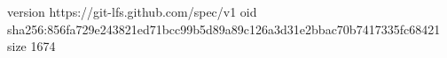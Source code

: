 version https://git-lfs.github.com/spec/v1
oid sha256:856fa729e243821ed71bcc99b5d89a89c126a3d31e2bbac70b7417335fc68421
size 1674
